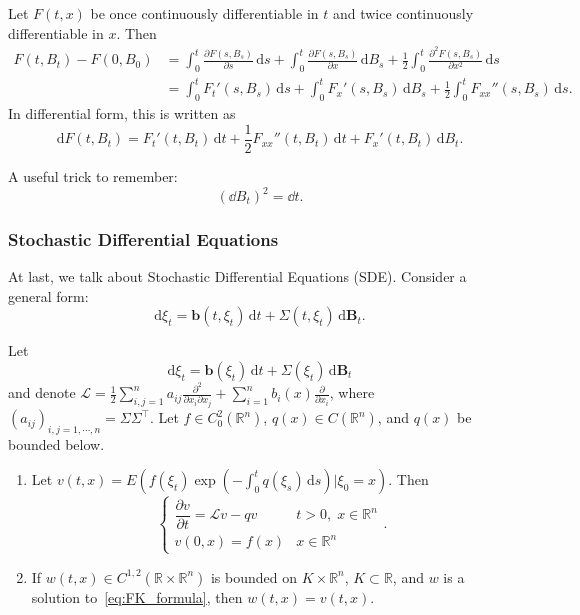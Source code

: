 \begin{thm}
Let $F(t, x)$ be once continuously differentiable in $t$ and twice continuously differentiable in $x$. Then
\begin{align*}
F(t, B_t) - F(0, B_0) &= \int_0^t \frac{\partial F(s, B_s)}{\partial s} \, \mathrm{d}s + \int_0^t \frac{\partial F(s, B_s)}{\partial x} \, \mathrm{d}B_s + \frac{1}{2} \int_0^t \frac{\partial^2 F(s, B_s)}{\partial x^2} \, \mathrm{d}s \\
&= \int_0^t F_t'(s, B_s) \, \mathrm{d}s + \int_0^t F_x'(s, B_s) \, \mathrm{d}B_s + \frac{1}{2} \int_0^t F_{xx}''(s, B_s) \, \mathrm{d}s.
\end{align*}
In differential form, this is written as
\[
\mathrm{d}F(t, B_t) = F_t'(t, B_t) \, \mathrm{d}t + \frac{1}{2} F_{xx}''(t, B_t) \, \mathrm{d}t + F_x'(t, B_t) \, \mathrm{d}B_t.
\]
\end{thm}
\begin{rem}
    A useful trick to remember:
    \[
    (\dd B_t)^2 = \dd t.
    \]
\end{rem}

\subsubsection{Stochastic Differential Equations}

At last, we talk about Stochastic Differential Equations (SDE). Consider a general form:
\[
\mathrm{d}\xi_t = \mathbf{b}(t, \xi_t) \, \mathrm{d}t + \Sigma(t, \xi_t) \, \mathrm{d}\mathbf{B}_t.
\]

\begin{thm}
Let
\begin{equation}
\mathrm{d}\xi_t = \mathbf{b}(\xi_t) \, \mathrm{d}t + \Sigma(\xi_t) \, \mathrm{d}\mathbf{B}_t
\end{equation}
and denote $\mathcal{L} = \frac{1}{2}\sum_{i,j=1}^{n} a_{ij} \frac{\partial^2}{\partial x_i \partial x_j} + \sum_{i=1}^{n} b_i(x) \frac{\partial}{\partial x_i}$, where $(a_{ij})_{i,j=1,\cdots,n} = \Sigma\Sigma^\top$. Let $f \in C_0^2(\mathbb{R}^n)$, $q(x) \in C(\mathbb{R}^n)$, and $q(x)$ be bounded below.
\begin{enumerate}
    \item Let $v(t, x) = E\left(f(\xi_t) \exp\left(-\int_0^t q(\xi_s) \, \mathrm{d}s\right) \bigg| \xi_0 = x\right)$. Then
    \begin{equation}
    \label{eq:FK_formula}
    \begin{cases}
    \dfrac{\partial v}{\partial t} = \mathcal{L}v - qv & t > 0, \; x \in \mathbb{R}^n \\[6pt]
    v(0, x) = f(x) & x \in \mathbb{R}^n
    \end{cases}.
    \end{equation}
    \item If $w(t, x) \in C^{1,2}(\mathbb{R} \times \mathbb{R}^n)$ is bounded on $K \times \mathbb{R}^n$, $K \subset \mathbb{R}$, and $w$ is a solution to~\eqref{eq:FK_formula}, then $w(t, x) = v(t, x)$.
\end{enumerate}
\end{thm}

